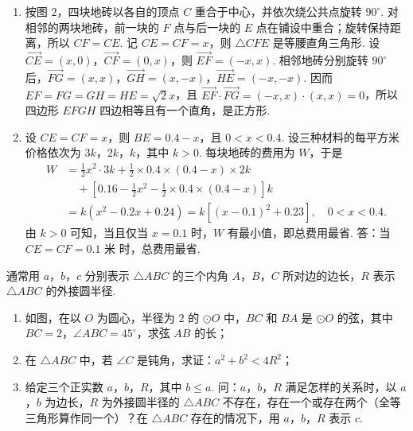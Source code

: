 \begin{solution}
\begin{enumerate}
\item 按图 2，四块地砖以各自的顶点 \(C\) 重合于中心，并依次绕公共点旋转 \(90^\circ\). 对相邻的两块地砖，前一块的 \(F\) 点与后一块的 \(E\) 点在铺设中重合；旋转保持距离，所以 \(CF=CE\). 记 \(CE=CF=x\)，则 \(\triangle CFE\) 是等腰直角三角形. 设 \(\overrightarrow{CE}=(x,0)\)，\(\overrightarrow{CF}=(0,x)\)，则 \(\overrightarrow{EF}=(-x,x)\). 相邻地砖分别旋转 \(90^\circ\) 后，\(\overrightarrow{FG}=(x,x)\)，\(\overrightarrow{GH}=(x,-x)\)，\(\overrightarrow{HE}=(-x,-x)\). 因而
\(EF=FG=GH=HE=\sqrt{2}x\)，且 \(\overrightarrow{EF}\cdot\overrightarrow{FG}=(-x,x)\cdot(x,x)=0\)，所以四边形 \(EFGH\) 四边相等且有一个直角，是正方形.

\item 设 \(CE=CF=x\)，则 \(BE=0.4-x\)，且 \(0<x<0.4\). 设三种材料的每平方米价格依次为 \(3k\)，\(2k\)，\(k\)，其中 \(k>0\). 每块地砖的费用为 \(W\)，于是
\[
\begin{aligned}
W&=\frac{1}{2}x^2\cdot 3k+\frac{1}{2}\times 0.4\times(0.4-x)\times 2k\\
&\quad+\left[0.16-\frac{1}{2}x^2-\frac{1}{2}\times 0.4\times(0.4-x)\right]k\\
&=k(x^2-0.2x+0.24)
=k\left[(x-0.1)^2+0.23\right],\quad 0<x<0.4.
\end{aligned}
\]
由 \(k>0\) 可知，当且仅当 \(x=0.1\) 时，\(W\) 有最小值，即总费用最省. 答：当 \(CE=CF=0.1\text{ 米}\) 时，总费用最省.
\end{enumerate}
\end{solution}

\begin{problem}
通常用 \(a\)，\(b\)，\(c\) 分别表示 \(\triangle ABC\) 的三个内角 \(A\)，\(B\)，\(C\) 所对边的边长，\(R\) 表示 \(\triangle ABC\) 的外接圆半径.

\begin{enumerate}
\item 如图，在以 \(O\) 为圆心，半径为 \(2\) 的 \(\odot O\) 中，\(BC\) 和 \(BA\) 是 \(\odot O\) 的弦，其中 \(BC=2\)，\(\angle ABC=45^\circ\)，求弦 \(AB\) 的长；
\item 在 \(\triangle ABC\) 中，若 \(\angle C\) 是钝角，求证：\(a^2+b^2<4R^2\)；
\item 给定三个正实数 \(a\)，\(b\)，\(R\)，其中 \(b\leqslant a\). 问：\(a\)，\(b\)，\(R\) 满足怎样的关系时，以 \(a\)，\(b\) 为边长，\(R\) 为外接圆半径的 \(\triangle ABC\) 不存在，存在一个或存在两个（全等三角形算作同一个）？在 \(\triangle ABC\) 存在的情况下，用 \(a\)，\(b\)，\(R\) 表示 \(c\).
\end{enumerate}

\end{problem}

